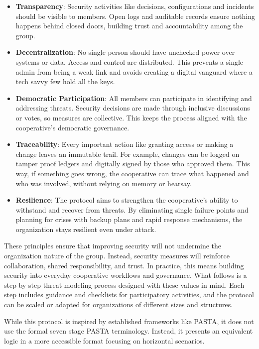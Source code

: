 \begin{itemize}
    \item \textbf{Transparency}: Security activities like decisions,
configurations and incidents should be visible to members. Open logs and
auditable records ensure nothing happens behind closed doors, building trust
and accountability among the group.
    \item \textbf{Decentralization}: No single person should have unchecked
power over systems or data. Access and control are distributed. This prevents a
single admin from being a weak link and avoids creating a digital vanguard
where a tech savvy few hold all the keys.
    \item \textbf{Democratic Participation}: All members can participate in
identifying and addressing threats. Security decisions are made through
inclusive discussions or votes, so measures are collective. This keeps
the process aligned with the cooperative's democratic governance.
    \item \textbf{Traceability}: Every important action like granting access or making
a change leaves an immutable trail. For example, changes can be logged on
tamper proof ledgers and digitally signed by those who approved them. This way,
if something goes wrong, the cooperative can trace what happened and who was involved,
without relying on memory or hearsay.
    \item \textbf{Resilience}: The protocol aims to strengthen the cooperative's
ability to withstand and recover from threats. By eliminating single failure
points and planning for crises with backup plans and rapid response
mechanisms, the organization stays resilient even under attack.
\end{itemize}

These principles ensure that improving security will not undermine the
organization nature of the group. Instead, security measures will reinforce
collaboration, shared responsibility, and trust. In practice, this means
building security into everyday cooperative workflows and governance. What
follows is a step by step threat modeling process designed with these values in
mind. Each step includes guidance and checklists for participatory activities,
and the protocol can be scaled or adapted for organizations of different
sizes and structures.

While this protocol is inspired by established frameworks like PASTA,
it does not use the formal seven stage PASTA terminology. Instead, it
presents an equivalent logic in a more accessible format focusing on
horizontal scenarios.


